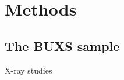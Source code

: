 
\chapter{Methods} %
\label{chap:xray}


\section{The BUXS sample}
\label{sec3:intro}
X-ray studies 